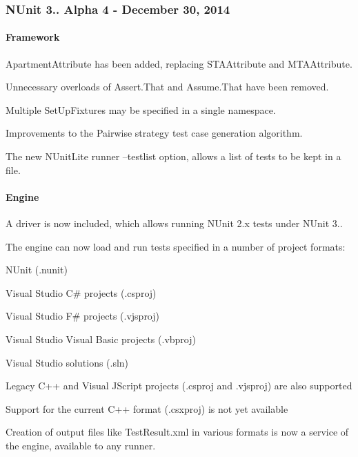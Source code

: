 \subsubsection*{N\+Unit 3.. Alpha 4 -\/ December 30, 2014}

\paragraph*{Framework}


\begin{DoxyItemize}
\item Apartment\+Attribute has been added, replacing S\+T\+A\+Attribute and M\+T\+A\+Attribute.
\item Unnecessary overloads of Assert.\+That and Assume.\+That have been removed.
\item Multiple Set\+Up\+Fixtures may be specified in a single namespace.
\item Improvements to the Pairwise strategy test case generation algorithm.
\item The new N\+Unit\+Lite runner --testlist option, allows a list of tests to be kept in a file.
\end{DoxyItemize}

\paragraph*{Engine}


\begin{DoxyItemize}
\item A driver is now included, which allows running N\+Unit 2.\+x tests under N\+Unit 3..
\item The engine can now load and run tests specified in a number of project formats\+:
\begin{DoxyItemize}
\item N\+Unit (.nunit)
\item Visual Studio C\# projects (.csproj)
\item Visual Studio F\# projects (.vjsproj)
\item Visual Studio Visual Basic projects (.vbproj)
\item Visual Studio solutions (.sln)
\item Legacy C++ and Visual J\+Script projects (.csproj and .vjsproj) are also supported
\item Support for the current C++ format (.csxproj) is not yet available
\end{DoxyItemize}
\item Creation of output files like Test\+Result.\+xml in various formats is now a service of the engine, available to any runner.
\end{DoxyItemize}


